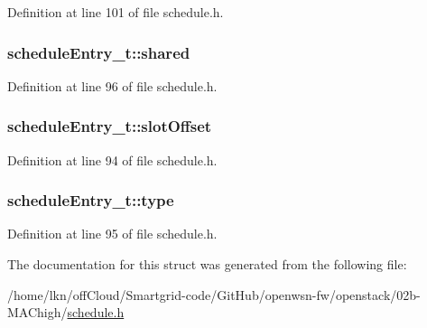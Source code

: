 Definition at line 101 of file schedule.\+h.

\subsubsection[{\texorpdfstring{shared}{shared}}]{ schedule\+Entry\+\_\+t\+::shared}\hypertarget{structschedule_entry__t_a6e99ef675df0af10aac4235181a1184f}{}\label{structschedule_entry__t_a6e99ef675df0af10aac4235181a1184f}


Definition at line 96 of file schedule.\+h.

\subsubsection[{\texorpdfstring{slot\+Offset}{slotOffset}}]{ schedule\+Entry\+\_\+t\+::slot\+Offset}\hypertarget{structschedule_entry__t_a635dac221078c4d63365ccf2b65fa273}{}\label{structschedule_entry__t_a635dac221078c4d63365ccf2b65fa273}


Definition at line 94 of file schedule.\+h.

\subsubsection[{\texorpdfstring{type}{type}}]{ schedule\+Entry\+\_\+t\+::type}\hypertarget{structschedule_entry__t_ac6347609af7ef7e8adcf0a4d2a91991a}{}\label{structschedule_entry__t_ac6347609af7ef7e8adcf0a4d2a91991a}


Definition at line 95 of file schedule.\+h.



The documentation for this struct was generated from the following file\+:\begin{DoxyCompactItemize}
\item 
/home/lkn/off\+Cloud/\+Smartgrid-\/code/\+Git\+Hub/openwsn-\/fw/openstack/02b-\/\+M\+A\+Chigh/\hyperlink{schedule_8h}{schedule.\+h}\end{DoxyCompactItemize}
